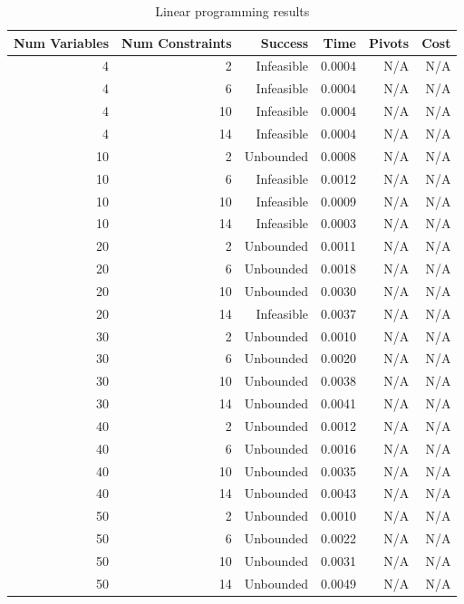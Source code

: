 \begin{table}[ht]
    \centering
    \begin{tabular}{rrrrrr}
        \toprule
        Num Variables & Num Constraints & Success & Time & Pivots & Cost \\
        \midrule
        4 & 2 & Infeasible & 0.0004 & N/A & N/A \\
		4 & 6 & Infeasible & 0.0004 & N/A & N/A \\
		4 & 10 & Infeasible & 0.0004 & N/A & N/A \\
		4 & 14 & Infeasible & 0.0004 & N/A & N/A \\
		10 & 2 & Unbounded & 0.0008 & N/A & N/A \\
		10 & 6 & Infeasible & 0.0012 & N/A & N/A \\
		10 & 10 & Infeasible & 0.0009 & N/A & N/A \\
		10 & 14 & Infeasible & 0.0003 & N/A & N/A \\
		20 & 2 & Unbounded & 0.0011 & N/A & N/A \\
		20 & 6 & Unbounded & 0.0018 & N/A & N/A \\
		20 & 10 & Unbounded & 0.0030 & N/A & N/A \\
		20 & 14 & Infeasible & 0.0037 & N/A & N/A \\
		30 & 2 & Unbounded & 0.0010 & N/A & N/A \\
		30 & 6 & Unbounded & 0.0020 & N/A & N/A \\
		30 & 10 & Unbounded & 0.0038 & N/A & N/A \\
		30 & 14 & Unbounded & 0.0041 & N/A & N/A \\
		40 & 2 & Unbounded & 0.0012 & N/A & N/A \\
		40 & 6 & Unbounded & 0.0016 & N/A & N/A \\
		40 & 10 & Unbounded & 0.0035 & N/A & N/A \\
		40 & 14 & Unbounded & 0.0043 & N/A & N/A \\
		50 & 2 & Unbounded & 0.0010 & N/A & N/A \\
		50 & 6 & Unbounded & 0.0022 & N/A & N/A \\
		50 & 10 & Unbounded & 0.0031 & N/A & N/A \\
		50 & 14 & Unbounded & 0.0049 & N/A & N/A \\
        \bottomrule
    \end{tabular}
    \caption{Linear programming results}
    \label{tab:lp-results}
\end{table}